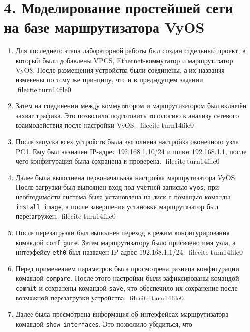 \documentclass[
  english,
  russian,
  12pt,
  a4paper,
  DIV=11,
  numbers=noendperiod]{scrreprt}
\begin{document}
\section{4. Моделирование простейшей сети на базе маршрутизатора
VyOS}\label{ux43cux43eux434ux435ux43bux438ux440ux43eux432ux430ux43dux438ux435-ux43fux440ux43eux441ux442ux435ux439ux448ux435ux439-ux441ux435ux442ux438-ux43dux430-ux431ux430ux437ux435-ux43cux430ux440ux448ux440ux443ux442ux438ux437ux430ux442ux43eux440ux430-vyos}

\begin{enumerate}
\def\labelenumi{\arabic{enumi}.}
\item
  Для последнего этапа лабораторной работы был создан отдельный проект,
  в который были добавлены VPCS, Ethernet-коммутатор и маршрутизатор
  VyOS. После размещения устройства были соединены, а их названия
  изменены по тому же принципу, что и в предыдущем задании.
  fileciteturn14file0
\item
  Затем на соединении между коммутатором и маршрутизатором был включён
  захват трафика. Это позволило подготовить топологию к анализу сетевого
  взаимодействия после настройки VyOS. fileciteturn14file0
\item
  После запуска всех устройств была выполнена настройка оконечного узла
  PC1. Ему был назначен IP-адрес 192.168.1.10/24 и шлюз 192.168.1.1,
  после чего конфигурация была сохранена и проверена.
  fileciteturn14file0
\item
  Далее была выполнена первоначальная настройка маршрутизатора VyOS.
  После загрузки был выполнен вход под учётной записью \texttt{vyos},
  при необходимости система была установлена на диск с помощью команды
  \texttt{install\ image}, а после завершения установки маршрутизатор
  был перезагружен. fileciteturn14file0
\item
  После перезагрузки был выполнен переход в режим конфигурирования
  командой \texttt{configure}. Затем маршрутизатору было присвоено имя
  узла, а интерфейсу \texttt{eth0} был назначен IP-адрес 192.168.1.1/24.
  fileciteturn14file0
\item
  Перед применением параметров была просмотрена разница конфигурации
  командой \texttt{compare}. После этого настройки были зафиксированы
  командой \texttt{commit} и сохранены командой \texttt{save}, что
  обеспечило их сохранение после возможной перезагрузки устройства.
  fileciteturn14file0
\item
  Далее была просмотрена информация об интерфейсах маршрутизатора
  командой \texttt{show\ interfaces}. Это позволило убедиться, что

\end{enumerate}
\end{document}
